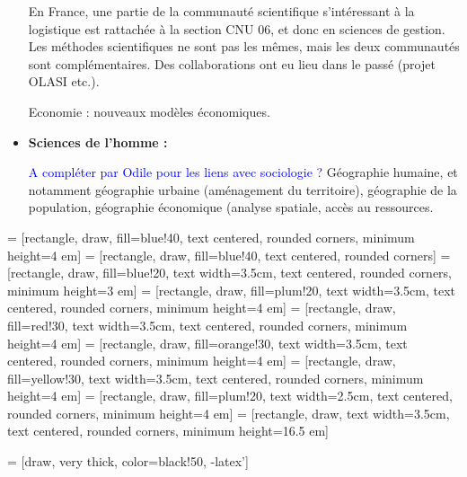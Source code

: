 \begin{itemize}
	    En France, une partie de la communauté scientifique s'intéressant à la logistique est rattachée à la section CNU 06, et donc en sciences de gestion. Les méthodes scientifiques ne sont pas les mêmes, mais les deux communautés sont complémentaires. Des collaborations ont eu lieu dans le passé (projet OLASI etc.). 
	    
	    Economie : nouveaux modèles économiques. 
	    
	    \item \textbf{Sciences de l'homme : }
	    
	    \textcolor{blue}{A compléter par Odile pour les liens avec sociologie ? }
	    Géographie humaine, et notamment géographie urbaine (aménagement du territoire), géographie de la population, géographie économique (analyse spatiale, accès au ressources. 
	    
	\end{itemize}
	
		
		
 = [rectangle, draw, fill=blue!40, text centered, rounded corners, minimum height=4 em]		
 = [rectangle, draw, fill=blue!40, text centered, rounded corners]		
 = [rectangle, draw, fill=blue!20, text width=3.5cm, text centered, rounded corners, minimum height=3 em]
 = [rectangle, draw, fill=plum!20, text width=3.5cm, text centered, rounded corners, minimum height=4 em]
 = [rectangle, draw, fill=red!30, text width=3.5cm, text centered, rounded corners, minimum height=4 em]
 = [rectangle, draw, fill=orange!30, text width=3.5cm, text centered, rounded corners, minimum height=4 em]
 = [rectangle, draw, fill=yellow!30, text width=3.5cm, text centered, rounded corners, minimum height=4 em]
 = [rectangle, draw, fill=plum!20, text width=2.5cm, text centered, rounded corners, minimum height=4 em]
 = [rectangle, draw, text width=3.5cm, text centered, rounded corners, minimum height=16.5 em]

 = [draw, very thick, color=black!50, -latex']

